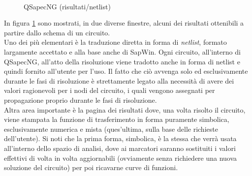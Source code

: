 \begin{figure}[ht]
 \centering
 \\
 \caption{QSapecNG (risultati/netlist)}
 \label{fig:qsapecng-resnl}
\end{figure}

In figura \ref{fig:qsapecng-resnl} sono mostrati, in due diverse finestre, alcuni dei risultati ottenibili a partire dallo schema di un circuito.\\
Uno dei più elementari è la traduzione diretta in forma di \textit{netlist}, formato largamente accettato e alla base anche di SapWin. Ogni circuito, all'interno di QSapecNG, all'atto della risoluzione viene tradotto anche in forma di netlist e quindi fornito all'utente per l'uso. Il fatto che ciò avvenga solo ed esclusivamente durante le fasi di risoluzione è strettamente legato alla necessità di avere dei valori ragionevoli per i nodi del circuito, i quali vengono assegnati per propagazione proprio durante le fasi di risoluzione.\\
Altra area importante è la pagina dei risultati dove, una volta risolto il circuito, viene stampata la funzione di trasferimento in forma puramente simbolica, esclusivamente numerica e mista (ques'ultima, sulla base delle richieste dell'utente). Si noti che la prima forma, simbolica, è la stessa che verrà usata all'interno dello spazio di analisi, dove ai marcatori saranno sostituiti i valori effettivi di volta in volta aggiornabili (ovviamente senza richiedere una nuova soluzione del circuito) per poi ricavarne curve di funzioni.

